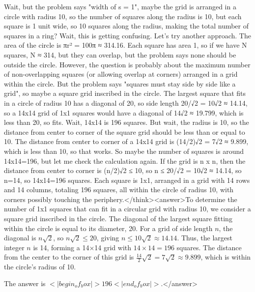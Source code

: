 Wait, but the problem says "width of s = 1", maybe the grid is arranged in a circle with radius 10, so the number of squares along the radius is 10, but each square is 1 unit wide, so 10 squares along the radius, making the total number of squares in a ring? Wait, this is getting confusing. Let's try another approach. The area of the circle is πr² = 100π ≈ 314.16. Each square has area 1, so if we have N squares, N ≈ 314, but they can overlap, but the problem says none should be outside the circle. However, the question is probably about the maximum number of non-overlapping squares (or allowing overlap at corners) arranged in a grid within the circle. But the problem says "squares must stay side by side like a grid", so maybe a square grid inscribed in the circle. The largest square that fits in a circle of radius 10 has a diagonal of 20, so side length 20/√2 = 10√2 ≈ 14.14, so a 14x14 grid of 1x1 squares would have a diagonal of 14√2 ≈ 19.799, which is less than 20, so fits. Wait, 14x14 is 196 squares. But wait, the radius is 10, so the distance from center to corner of the square grid should be less than or equal to 10. The distance from center to corner of a 14x14 grid is (14/2)√2 = 7√2 ≈ 9.899, which is less than 10, so that works. So maybe the number of squares is around 14x14=196, but let me check the calculation again. If the grid is n x n, then the distance from center to corner is (n/2)√2 ≤ 10, so n ≤ 20/√2 = 10√2 ≈ 14.14, so n=14, so 14x14=196 squares. Each square is 1x1, arranged in a grid with 14 rows and 14 columns, totaling 196 squares, all within the circle of radius 10, with corners possibly touching the periphery.</think><answer>To determine the number of 1x1 squares that can fit in a circular grid with radius 10, we consider a square grid inscribed in the circle. The diagonal of the largest square fitting within the circle is equal to its diameter, 20. For a grid of side length \( n \), the diagonal is \( n\sqrt{2} \), so \( n\sqrt{2} \leq 20 \), giving \( n \leq 10\sqrt{2} \approx 14.14 \). Thus, the largest integer \( n \) is 14, forming a 14×14 grid with \( 14 \times 14 = 196 \) squares. The distance from the center to the corner of this grid is \( \frac{14}{2}\sqrt{2} = 7\sqrt{2} \approx 9.899 \), which is within the circle's radius of 10.  

The answer is \(<|begin_of_box|>196<|end_of_box|>\).</answer>